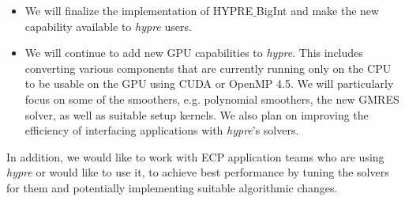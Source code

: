 \begin{itemize}

\item We will finalize the implementation of HYPRE$\_$BigInt and make the new capability available to {\sl hypre} users. 

\item We will continue to add new GPU capabilities to {\sl hypre}. This includes converting various components that are currently running only on the CPU to be usable on the GPU using CUDA or OpenMP 4.5. We will particularly focus on some of the smoothers, e.g. polynomial smoothers, the new GMRES solver, as well as suitable setup kernels. We also plan on improving the efficiency of interfacing applications with {\sl hypre}'s solvers.
\end{itemize}
In addition, we would like to work with ECP application teams who are using {\sl hypre} or would like to use it, to achieve best performance by tuning the solvers for them and potentially implementing suitable algorithmic changes. 


